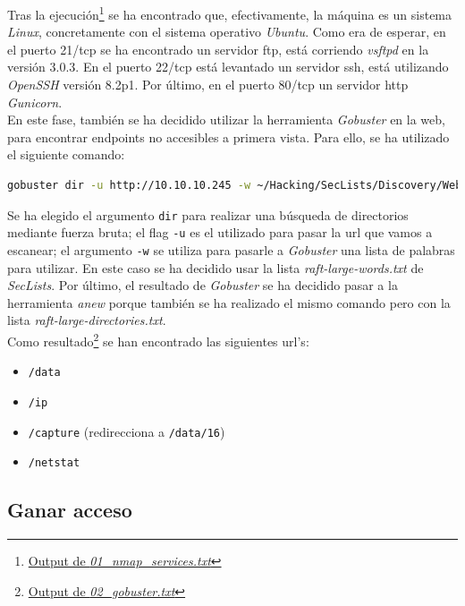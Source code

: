 Tras la ejecución\footnote{\href{https://github.com/VictorNS69/TFM/blob/main/machines/cap/01_nmap_services.txt}{Output de \textit{01\_nmap\_services.txt}}} se ha encontrado que, efectivamente, la máquina es un sistema \textit{Linux}, concretamente con el sistema operativo \textit{Ubuntu}. Como era de esperar, en el puerto 21/\acrshort{tcp} se ha encontrado un servidor \acrshort{ftp}, está corriendo \textit{vsftpd}\cite{vsftpd} en la versión 3.0.3. En el puerto 22/\acrshort{tcp} está levantado un servidor \acrshort{ssh}, está utilizando \textit{OpenSSH}\cite{openssh} versión 8.2p1. Por último, en el puerto 80/\acrshort{tcp} un servidor \acrshort{http} \textit{Gunicorn}\cite{gunicorn}.\\

En este fase, también se ha decidido utilizar la herramienta \textit{Gobuster}\cite{gobuster} en la web, para encontrar endpoints no accesibles a primera vista. Para ello, se ha utilizado el siguiente comando:
\begin{lstlisting}[language=bash]
gobuster dir -u http://10.10.10.245 -w ~/Hacking/SecLists/Discovery/Web-Content/raft-large-words.txt | anew 03_gobuster.txt
\end{lstlisting}
Se ha elegido el argumento \texttt{dir} para realizar una búsqueda de directorios mediante fuerza bruta; el flag \texttt{-u} es el utilizado para pasar la \acrshort{url} que vamos  a escanear; el argumento \texttt{-w} se utiliza para pasarle a \textit{Gobuster} una lista de palabras para utilizar. En este caso se ha decidido usar la lista \textit{raft-large-words.txt} de \textit{SecLists}\cite{seclists}. Por último, el resultado de \textit{Gobuster} se ha decidido pasar a la herramienta \textit{anew}\cite{anew} porque también se ha realizado el mismo comando pero con la lista \textit{raft-large-directories.txt}.\\

Como resultado\footnote{\href{https://github.com/VictorNS69/TFM/blob/main/machines/cap/02_gobuster.txt}{Output de \textit{02\_gobuster.txt}}} se han encontrado las siguientes \acrshort{url}'s:
\begin{itemize}
    \item \texttt{/data}
    \item \texttt{/ip}
    \item \texttt{/capture} (redirecciona a \texttt{/data/16})
    \item \texttt{/netstat}
\end{itemize}

\subsection{Ganar acceso}

